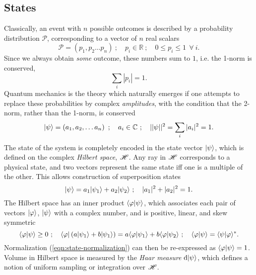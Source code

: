 \subsection{States}
\label{sec:quantum-mechanics-states}
Classically, an event with $n$ possible outcomes is described by a probability distribution $\mathcal{P}$, corresponding to a vector of $n$ real scalars
\begin{equation}
   \mathcal{P} = \left( p_1, p_2 \ldots p_n \right)~;\quad p_i \in \mathbb{R}~;\quad 0\le p_i \le 1~~\forall~i.
\end{equation}
Since we always obtain \emph{some} outcome, these numbers sum to $1$, i.e. the 1-norm is conserved, 
\begin{equation}
\sum_i|p_i|  = 1.
\end{equation}
Quantum mechanics is the theory which naturally emerges if one attempts to replace these probabilities by complex \emph{amplitudes}, with the condition that the 2-norm, rather than the 1-norm, is conserved
\begin{equation}
   \mbox{$ | \psi \rangle $} = \left( a_1 , a_2, \ldots a_n \right) ~; \quad a_i \in \mathbb{C} ~; \quad ||\psi||^2 = \sum_i |a_i|^2 = 1.
   \label{eqn:state-normalization}
\end{equation}
The state of the system is completely encoded in the state vector $\mbox{$ | \psi \rangle $}$, which is defined on the complex \emph{Hilbert space}, $\mathscr{H}$. Any ray in $\mathscr{H}$ corresponds to a physical state, and two vectors represent the same state iff one is a multiple of the other. This allows construction of superposition states
\begin{equation}
    \mbox{$ | \psi \rangle $} = a_1\mbox{$ | \psi_1 \rangle $} + a_2 \mbox{$ | \psi_2 \rangle $} ~;\quad |a_1|^2 + |a_2|^2 = 1.
\end{equation}
The Hilbert space has an inner product $\langle \varphi | \psi \rangle$, which associates each pair of vectors $\mbox{$ | \varphi \rangle $}$, $\mbox{$ | \psi \rangle $}$ with a complex number, and is positive, linear, and skew symmetric
\begin{equation}
   \langle \varphi | \psi \rangle \ge 0 ~; \quad 
   \mbox{$ \langle \varphi | $}\left(a \mbox{$ | \psi_1 \rangle $} + b \mbox{$ | \psi_1 \rangle $}\right) 
   = a \langle \varphi | \psi_1 \rangle + b \langle \varphi | \psi_2 \rangle  ~; \quad 
   \langle \varphi | \psi \rangle = \langle \psi | \varphi \rangle^*.
\end{equation}
Normalization (\ref{eqn:state-normalization}) can then be re-expressed as $\langle \varphi | \psi \rangle=1$.
Volume in Hilbert space is measured by the \emph{Haar measure} $\mathrm{d} \mbox{$ | \psi \rangle $}$, which defines a notion of uniform sampling or integration over $\mathscr{H}$. 

